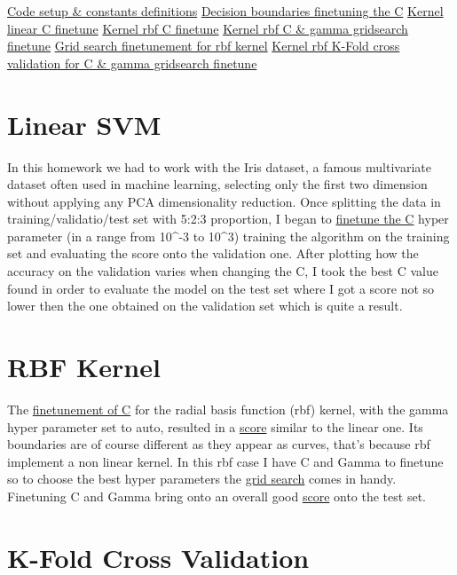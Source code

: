 \documentclass[11pt]{article}
\begin{document}
\hyperlink{definitions}{Code setup \& constants definitions}
\hyperlink{cfinetune}{Decision boundaries finetuning the C}\newline
\hyperlink{linear}{Kernel linear C finetune}\newline
\hyperlink{CRbfResults}{Kernel rbf C finetune}\newline
\hyperlink{gridsearch}{Kernel rbf C \& gamma gridsearch finetune}\newline
\hyperlink{gsRbfResults}{Grid search finetunement for rbf kernel}\newline
\hyperlink{crossval}{Kernel rbf K-Fold cross validation for C \& gamma gridsearch finetune}

\section{Linear SVM}\label{linear-svm}

In this homework we had to work with the Iris dataset, a famous
multivariate dataset often used in machine learning, selecting only the
first two dimension without applying any PCA dimensionality reduction.
Once splitting the data in training/validatio/test set with 5:2:3
proportion, I began to \hyperlink{cfinetune}{finetune the C} hyper parameter (in a range from 10\^{}-3 to 10\^{}3) training the algorithm on the training
set and evaluating the score onto the validation one. After plotting how
the accuracy on the validation varies when changing the C, I took the
best C value found in order to evaluate the model on the test set where
I got a score not so lower then the one obtained on the validation set
which is quite a result.

\section{RBF Kernel}\label{rbf-kernel}

The \hyperlink{cfinetune}{finetunement of C} for the radial basis function (rbf) kernel, with the gamma hyper parameter set to auto, resulted in a \hyperlink{CRbfResults}{score} similar to
the linear one. Its boundaries are of course different as they appear as
curves, that's because rbf implement a non linear kernel. In this rbf
case I have C and Gamma to finetune so to choose the best hyper
parameters the \hyperlink{gridsearch}{grid search} comes in handy. Finetuning C and
Gamma bring onto an overall good \hyperlink{gsRbfResults}{score} onto the test
set.

\section{K-Fold Cross Validation}\label{k-fold-cross-validation}
\end{document}
